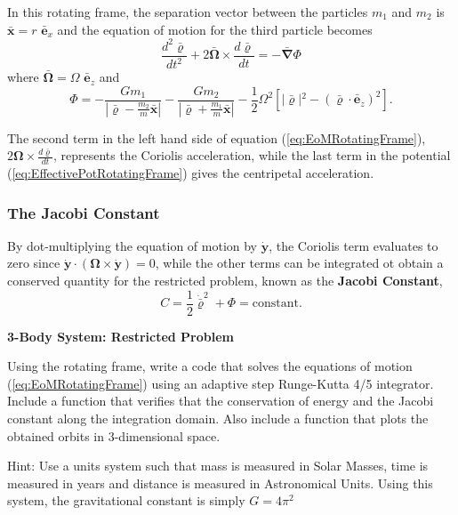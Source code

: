 In this rotating frame, the separation vector between the particles $m_1$ and $m_2$ is $\bar{\textbf{x}} = r \,\, \bar{\textbf{e}}_x $ and the equation of motion for the third particle becomes
\begin{equation}
    \frac{d^2\bar{\boldsymbol{\varrho}}}{dt^2} + 2\bar{\boldsymbol{\Omega}}\times\frac{d\bar{\boldsymbol{\varrho}}}{dt} = - \bar{\boldsymbol{\nabla}}\Phi \label{eq:EoMRotatingFrame}
\end{equation}
where $\bar{\boldsymbol{\Omega}} = \Omega \, \, \bar{\textbf{e}}_z$ and 
\begin{equation}
    \Phi=-\frac{Gm_{1}}{\left\vert{}\bar{\boldsymbol{\varrho}}-\frac{m_{2}}{m}\bar{\textbf{x}}\right\vert{}}-\frac{Gm_{2}}{\left\vert{}\bar{\boldsymbol{\varrho}}+\frac{m_{1}}{m}\bar{\textbf{x}}\right\vert{}}-\frac{1}{2}\Omega^{2}\left[\vert{}\bar{\boldsymbol{\varrho}}\vert{}^{2}-(\bar{\boldsymbol{\varrho}}\cdot\bar{\textbf{e}}_{z})^{2}\right].\label{eq:EffectivePotRotatingFrame}
\end{equation}

The second term in the left hand side of equation (\ref{eq:EoMRotatingFrame}), $2\boldsymbol{\Omega}\times\frac{d\bar{\boldsymbol{\varrho}}}{dt}$, represents the Coriolis acceleration, while the last term in the potential (\ref{eq:EffectivePotRotatingFrame}) gives the centripetal acceleration.

\subsubsection{The Jacobi Constant}

By dot-multiplying the equation of motion by $\dot{\textbf{y}}$, the Coriolis term evaluates to zero since $\dot{\textbf{y}}\cdot(\boldsymbol{\Omega}\times\dot{\textbf{y}}) = 0$, while the other terms can be integrated ot obtain a conserved quantity for the restricted problem, known as the \textbf{Jacobi Constant},
\begin{equation}
    C = \frac{1}{2}\dot{\bar{\boldsymbol{\varrho}}}^{2}+\Phi=\text{constant}.
\end{equation}

\begin{exercise}
 \textbf{3-Body System: Restricted Problem}
 
 Using the rotating frame, write a code that solves the equations of motion (\ref{eq:EoMRotatingFrame}) using an adaptive step Runge-Kutta 4/5 integrator. Include a function that verifies that the conservation of energy and the Jacobi constant along the integration domain. Also include a function that plots the obtained orbits in 3-dimensional space.

Hint: Use a units system such that mass is measured in Solar Masses, time is measured in years and distance is measured in Astronomical Units. Using this system, the gravitational constant is simply $G=4\pi^2$
\end{exercise}



